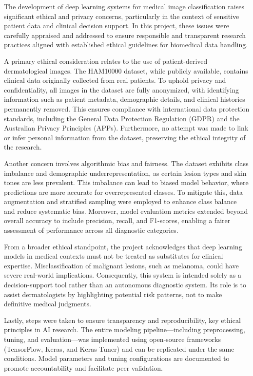 \documentclass[conference]{IEEEtran}
\begin{document}
	The development of deep learning systems for medical image classification raises significant ethical and privacy concerns, particularly in the context of sensitive patient data and clinical decision support. In this project, these issues were carefully appraised and addressed to ensure responsible and transparent research practices aligned with established ethical guidelines for biomedical data handling.
	
	A primary ethical consideration relates to the use of patient-derived dermatological images. The HAM10000 dataset, while publicly available, contains clinical data originally collected from real patients. To uphold privacy and confidentiality, all images in the dataset are fully anonymized, with identifying information such as patient metadata, demographic details, and clinical histories permanently removed. This ensures compliance with international data protection standards, including the General Data Protection Regulation (GDPR) and the Australian Privacy Principles (APPs)\cite{b3}. Furthermore, no attempt was made to link or infer personal information from the dataset, preserving the ethical integrity of the research.
	
	Another concern involves algorithmic bias and fairness. The dataset exhibits class imbalance and demographic underrepresentation, as certain lesion types and skin tones are less prevalent. This imbalance can lead to biased model behavior, where predictions are more accurate for overrepresented classes. To mitigate this, data augmentation and stratified sampling were employed to enhance class balance and reduce systematic bias. Moreover, model evaluation metrics extended beyond overall accuracy to include precision, recall, and F1-scores, enabling a fairer assessment of performance across all diagnostic categories.
	
	From a broader ethical standpoint, the project acknowledges that deep learning models in medical contexts must not be treated as substitutes for clinical expertise. Misclassification of malignant lesions, such as melanoma, could have severe real-world implications. Consequently, this system is intended solely as a decision-support tool rather than an autonomous diagnostic system. Its role is to assist dermatologists by highlighting potential risk patterns, not to make definitive medical judgments.
	
	Lastly, steps were taken to ensure transparency and reproducibility, key ethical principles in AI research. The entire modeling pipeline—including preprocessing, tuning, and evaluation—was implemented using open-source frameworks (TensorFlow, Keras, and Keras Tuner) and can be replicated under the same conditions. Model parameters and tuning configurations are documented to promote accountability and facilitate peer validation.
	
\end{document}
